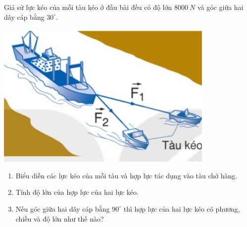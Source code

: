\begin{enumerate}[label=\bfseries Bài \arabic*:,leftmargin=1.5cm]
	{Giả sử lực kéo của mỗi tàu kéo ở đầu bài đều có độ lớn $\SI{8000}{N}$ và góc giữa hai dây cáp bằng $30^\circ$. 
		\begin{center}
			\includegraphics[width=0.35\linewidth]{../figs/VN10-2023-PH-TP014-P-1}
		\end{center}
		\begin{enumerate}[label=\alph*)]
			\item Biểu diễn các lực kéo của mỗi tàu và hợp lực tác dụng vào tàu chở hàng.
			\item Tính độ lớn của hợp lực của hai lực kéo.
			\item Nếu góc giữa hai dây cáp bằng $90^\circ$ thì hợp lực của hai lực kéo có phương, chiều và độ lớn như thế nào?
		\end{enumerate}
		
	}
	
\end{enumerate}
